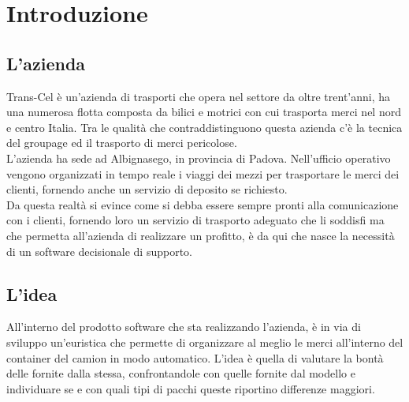 
\chapter{Introduzione}
\section{L'azienda}
Trans-Cel è un'azienda di trasporti che opera nel settore da oltre trent'anni, ha una numerosa flotta composta da bilici e motrici con cui trasporta merci nel nord e centro Italia.
Tra le qualità che contraddistinguono questa azienda c'è la tecnica del groupage ed il trasporto di merci pericolose.\\
L'azienda ha sede ad Albignasego, in provincia di Padova. Nell'ufficio operativo vengono organizzati in tempo reale i viaggi dei mezzi per trasportare le merci dei clienti, fornendo anche un servizio di deposito se richiesto.\\
Da questa realtà si evince come si debba essere sempre pronti alla comunicazione con i clienti, fornendo loro un servizio di trasporto adeguato che li soddisfi ma che permetta all'azienda di realizzare un profitto, è da qui che nasce la necessità di un software decisionale di supporto.
\newpage
\section{L'idea}
All'interno del prodotto software che sta realizzando l'azienda, è in via di sviluppo un'euristica che permette di organizzare al meglio le merci all'interno del container del camion in modo automatico. L'idea è quella di valutare la bontà delle  fornite dalla stessa, confrontandole con quelle fornite dal modello e individuare se e con quali tipi di pacchi queste riportino differenze maggiori.

